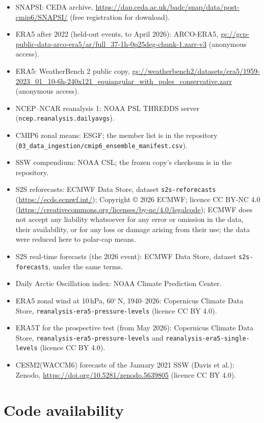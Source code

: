 \documentclass[11pt]{article}
\begin{document}
\begin{itemize}[leftmargin=*,itemsep=1pt]
  \item SNAPSI: CEDA archive, \url{https://dap.ceda.ac.uk/badc/snap/data/post-cmip6/SNAPSI/} (free registration for download).
  \item ERA5 after 2022 (held-out events, to April 2026): ARCO-ERA5, \url{gs://gcp-public-data-arco-era5/ar/full_37-1h-0p25deg-chunk-1.zarr-v3} (anonymous access).
  \item ERA5: WeatherBench 2 public copy, \url{gs://weatherbench2/datasets/era5/1959-2023_01_10-6h-240x121_equiangular_with_poles_conservative.zarr} (anonymous access).
  \item NCEP–NCAR reanalysis 1: NOAA PSL THREDDS server (\nolinkurl{ncep.reanalysis.dailyavgs}).
  \item CMIP6 zonal means: ESGF; the member list is in the repository (\nolinkurl{03_data_ingestion/cmip6_ensemble_manifest.csv}).
  \item SSW compendium: NOAA CSL; the frozen copy's checksum is in the repository.
  \item S2S reforecasts: ECMWF Data Store, dataset \nolinkurl{s2s-reforecasts} (\url{https://ecds.ecmwf.int/}); Copyright © 2026 ECMWF; licence CC BY-NC 4.0 (\url{https://creativecommons.org/licenses/by-nc/4.0/legalcode}); ECMWF does not accept any liability whatsoever for any error or omission in the data, their availability, or for any loss or damage arising from their use; the data were reduced here to polar-cap means.
  \item S2S real-time forecasts (the 2026 event): ECMWF Data Store, dataset \nolinkurl{s2s-forecasts}, under the same terms.
  \item Daily Arctic Oscillation index: NOAA Climate Prediction Center.
  \item ERA5 zonal wind at 10\,hPa, 60$^\circ$\,N, 1940–2026: Copernicus Climate Data Store, \nolinkurl{reanalysis-era5-pressure-levels} (licence CC BY 4.0).
  \item ERA5T for the prospective test (from May 2026): Copernicus Climate Data Store, \nolinkurl{reanalysis-era5-pressure-levels} and \nolinkurl{reanalysis-era5-single-levels} (licence CC BY 4.0).
  \item CESM2(WACCM6) forecasts of the January 2021 SSW (Davis et al.\cite{davis22}): Zenodo, \url{https://doi.org/10.5281/zenodo.5639805} (licence CC BY 4.0).
\end{itemize}


\section*{Code availability}
\end{document}
